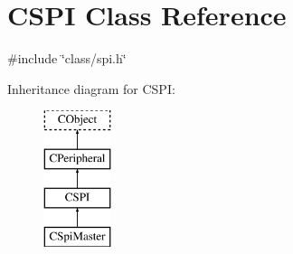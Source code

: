 \hypertarget{class_c_s_p_i}{\section{C\-S\-P\-I Class Reference}
\label{class_c_s_p_i}
}


{\ttfamily \#include \char`\"{}class/spi.\-h\char`\"{}}

Inheritance diagram for C\-S\-P\-I\-:\begin{figure}[H]
\begin{center}
\leavevmode
\includegraphics[height=4.000000cm]{d2/d3f/class_c_s_p_i}
\end{center}
\end{figure}
